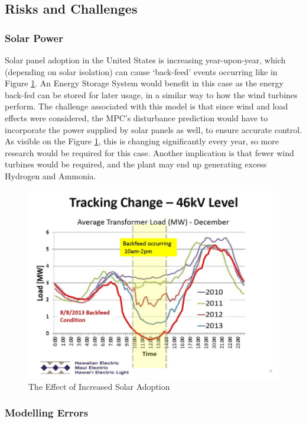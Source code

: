 \subsection{Risks and Challenges}

\subsubsection{Solar Power}

Solar panel adoption in the United States is increasing year-upon-year, which (depending on solar isolation) can cause `back-feed' events occurring like in Figure \ref{fig:solar}.
An Energy Storage System would benefit in this case as the energy back-fed can be stored for later usage, in a similar way to how the wind turbines perform.
The challenge associated with this model is that since wind and load effects were considered, the MPC's disturbance prediction would have to incorporate the power supplied by solar panels as well, to ensure accurate control.
As visible on the Figure \ref{fig:solar}, this is changing significantly every year, so more research would be required for this case.
Another implication is that fewer wind turbines would be required, and the plant may end up generating excess Hydrogen and Ammonia.
\begin{figure}[htb]
\includegraphics[scale=0.3]{images/backfeed.jpg}
\caption{The Effect of Increased Solar Adoption \cite{power:solar}}
\label{fig:solar}
\end{figure}

\subsubsection{Modelling Errors}

